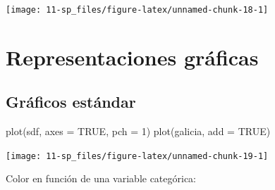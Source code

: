 \documentclass[
  spanish,
]{book}
\newenvironment{Shaded}{\begin{snugshade}}{\end{snugshade}}
\newcommand{\AttributeTok}[1]{\textcolor[rgb]{0.77,0.63,0.00}{#1}}
\newcommand{\CommentTok}[1]{\textcolor[rgb]{0.56,0.35,0.01}{\textit{#1}}}
\newcommand{\ConstantTok}[1]{\textcolor[rgb]{0.00,0.00,0.00}{#1}}
\newcommand{\DecValTok}[1]{\textcolor[rgb]{0.00,0.00,0.81}{#1}}
\newcommand{\FunctionTok}[1]{\textcolor[rgb]{0.00,0.00,0.00}{#1}}
\newcommand{\NormalTok}[1]{#1}
\newcommand{\OtherTok}[1]{\textcolor[rgb]{0.56,0.35,0.01}{#1}}
\newcommand{\SpecialCharTok}[1]{\textcolor[rgb]{0.00,0.00,0.00}{#1}}
\newcommand{\StringTok}[1]{\textcolor[rgb]{0.31,0.60,0.02}{#1}}
\theoremstyle{break}
\begin{document}
\begin{center}\texttt{[image: 11-sp\_files/figure-latex/unnamed-chunk-18-1]} \end{center}

\hypertarget{representaciones-gruxe1ficas}{%
\section{Representaciones gráficas}\label{representaciones-gruxe1ficas}}

\hypertarget{gruxe1ficos-estuxe1ndar}{%
\subsection{Gráficos estándar}\label{gruxe1ficos-estuxe1ndar}}

\begin{Shaded}
\begin{Highlighting}[]
\FunctionTok{plot}\NormalTok{(sdf, }\AttributeTok{axes =} \ConstantTok{TRUE}\NormalTok{, }\AttributeTok{pch =} \DecValTok{1}\NormalTok{)}
\FunctionTok{plot}\NormalTok{(galicia, }\AttributeTok{add =} \ConstantTok{TRUE}\NormalTok{)}
\end{Highlighting}
\end{Shaded}

\begin{center}\texttt{[image: 11-sp\_files/figure-latex/unnamed-chunk-19-1]} \end{center}

Color en función de una variable categórica:

\begin{Shaded}
\end{Shaded}
\end{document}
